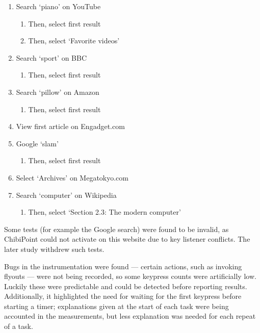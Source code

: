 \documentclass[a4paper, 12pt]{report}
\begin{document}
\begin{enumerate}
\item Search `piano' on YouTube
	\begin{enumerate}
        \item Then, select first result
        \item Then, select `Favorite videos'
    \end{enumerate}
	
\item Search `sport' on BBC
	\begin{enumerate}
		\item Then, select first result
	\end{enumerate}
	
\item Search `pillow' on Amazon
	\begin{enumerate}
		\item Then, select first result
	\end{enumerate}

\item View first article on Engadget.com

\item Google `slam'
	\begin{enumerate}
		\item Then, select first result
	\end{enumerate}

\item Select `Archives' on Megatokyo.com

\item Search `computer' on Wikipedia
	\begin{enumerate}
		\item Then, select `Section 2.3: The modern computer'
	\end{enumerate}
\end{enumerate}

Some tests (for example the Google search) were found to be invalid, as ChibiPoint could not activate on this website due to key listener conflicts. The later study withdrew such tests.

Bugs in the instrumentation were found --- certain actions, such as invoking flyouts --- were not being recorded, so some keypress counts were artificially low. Luckily these were predictable and could be detected before reporting results. Additionally, it highlighted the need for waiting for the first keypress before starting a timer; explanations given at the start of each task were being accounted in the measurements, but less explanation was needed for each repeat of a task.
\end{document}
